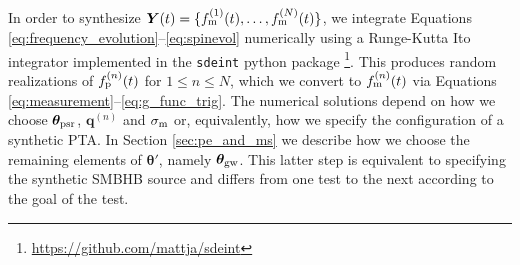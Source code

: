 \documentclass[fleqn,usenatbib,useAMS]{mnras}
\begin{document}
\begin{table}
{		}
		\label{tab:parameters_and_priors}
	\end{table}
In order to synthesize $\boldsymbol{Y}(t) = \{f_{\rm m}^{(1)}(t), \dots, f_{\rm m}^{(N)}(t) \}$, we integrate Equations \eqref{eq:frequency_evolution}--\eqref{eq:spinevol} numerically using a Runge-Kutta It$\hat{\text{o}}$ integrator implemented in the \texttt{sdeint} python package \footnote{\url{https://github.com/mattja/sdeint}}. This produces random realizations of $f_{\rm p}^{(n)}(t)$ for $1\leq n \leq N$, which we convert to $f_{\rm m}^{(n)}(t)$ via Equations \eqref{eq:measurement}--\eqref{eq:g_func_trig}. The numerical solutions depend on how we choose $\boldsymbol{\theta}_{\rm psr}$, ${\boldsymbol{q}}^{(n)}$ and $\sigma_{\rm m}$ or, equivalently, how we specify the configuration of a synthetic PTA. In Section  \ref{sec:pe_and_ms} we describe how we choose the remaining elements of $\boldsymbol{\theta}'$, namely $\boldsymbol{\theta}_{\rm gw}$. This latter step is equivalent to specifying the synthetic SMBHB source and differs from one test to the next according to the goal of the test.  \newline 
\end{document}
